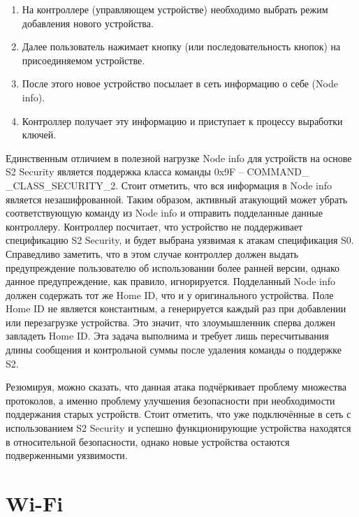 	\begin{enumerate}
		\item На контроллере (управляющем устройстве) необходимо выбрать режим добавления нового
		устройства.
		\item Далее пользователь нажимает кнопку (или последовательность кнопок) на присоединяемом
		устройстве.
		\item После этого новое устройство посылает в сеть информацию о себе (Node info).
		\item Контроллер получает эту информацию и приступает к процессу выработки ключей.
	\end{enumerate}

	Единственным отличием в полезной нагрузке Node info для устройств на основе S2 Security является
	поддержка класса команды 0x9F – COMMAND\_ \newline \_CLASS\_SECURITY\_2. Стоит отметить, что
	вся информация в Node info является незашифрованной. Таким образом, активный атакующий может
	убрать соответствующую команду из Node info и отправить подделанные данные контроллеру. Контроллер
	посчитает, что устройство не поддерживает спецификацию S2 Security, и будет выбрана уязвимая к атакам
	спецификация S0. Справедливо заметить, что в этом случае контроллер должен выдать предупреждение
	пользователю об использовании более ранней версии, однако данное предупреждение, как правило,
	игнорируется. Подделанный Node info должен содержать тот же Home ID, что и у оригинального
	устройства. Поле Home ID не является константным, а генерируется каждый раз при добавлении или
	перезагрузке устройства. Это значит, что злоумышленник сперва должен завладеть Home ID. Эта
	задача выполнима и требует лишь пересчитывания длины сообщения и контрольной суммы после удаления 
	команды о поддержке S2.
	
	Резюмируя, можно сказать, что данная атака подчёркивает проблему множества протоколов, а именно
	проблему улучшения безопасности при необходимости поддержания старых устройств. Стоит отметить,
	что уже подключённые в сеть с использованием S2 Security и успешно функционирующие устройства 
	находятся в относительной безопасности, однако новые устройства остаются подверженными уязвимости.
	
	
	\section{Wi-Fi}
	
	

